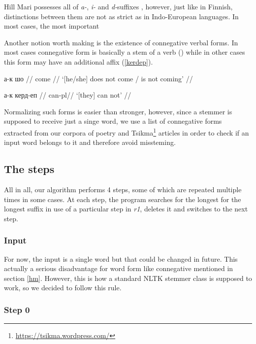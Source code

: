 \documentclass[a4paper,notitlepage]{article}
\begin{document}
Hill Mari possesses all of \textit{a-}, \textit{i-} and \textit{d-}suffixes \citep{snowball_old}, however, just like in Finnish, distinctions between them are not as strict as in Indo-European languages. In most cases, the most important  \newline



Another notion worth making is the existence of connegative verbal forms. In most cases connegative form is basically a stem of a verb (\nextx) while in other cases this form may have an additional affix (\ref{kerdep}).

\ex
\begingl
\gla а-к шо //
 come //
\glft `[he/she] does not come / is not coming' //
\endgl
\xe

\ex \label{kerdep}
\begingl
\gla а-к керд-еп //
 can{\sc -pl}//
\glft `[they] can not' //
\endgl
\xe

Normalizing such forms is easier than stronger, however, since a stemmer is supposed to receive just a singe word, we use a list of connegative forms extracted from our corpora of poetry and Tsikma\footnote{\url{https://tsikma.wordpress.com/}} articles in order to check if an input word belongs to it and therefore avoid missteming. \newline

\subsection{The steps}

All in all, our algorithm performs 4 steps, some of which are repeated multiple times in some cases. At each step, the program searches for the longest for the longest suffix in use of a particular step in \emph{r1}, deletes it and switches to the next step.

\subsubsection{Input}

For now, the input is a single word but that could be changed in future. This actually a serious disadvantage for word form like connegative mentioned in section \ref{hm}. However, this is how a standard NLTK stemmer class is supposed to work, so we decided to follow this rule.

\subsubsection{Step 0}
\end{document}
